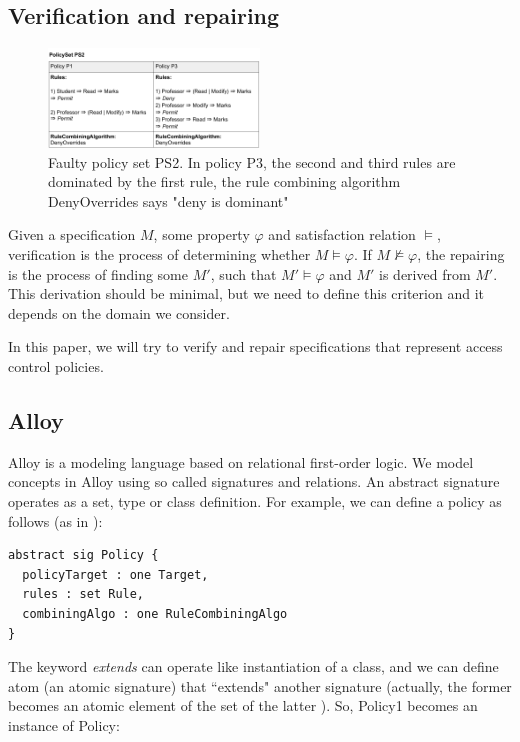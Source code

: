 \documentclass[letterpaper]{acm_proc_article-sp}
\begin{document}
\subsection{Verification and repairing}

\begin{figure}[h]
\includegraphics[width=0.5\textwidth]{policyset_faulty.png}
\caption{Faulty policy set PS2. In policy P3, the second and third rules are dominated by the first rule, the rule combining algorithm DenyOverrides says "deny is dominant"}    
  \label{fig:policysetfaulty}
\end{figure}

Given a specification $M$, some property $\varphi$ and satisfaction relation $\models$, verification is the process of determining whether $M\models\varphi$. If $M\not\models\varphi$, the repairing is the process of finding some $M'$, such that $M'\models\varphi$ and $M'$ is derived from $M'$. This derivation should be minimal, but we need to define this criterion and it depends on the domain we consider.

In this paper, we will try to verify and repair specifications that represent access control policies.

\subsection{Alloy}
Alloy \cite{jackson:alloy} is a modeling language based on relational first-order logic. We model concepts in Alloy using so called signatures and relations. An abstract signature operates as a set, type or class definition. For example, we can define a policy as follows (as in \cite{acp:alloy}):
 
 \begin{verbatim}
abstract sig Policy {
  policyTarget : one Target,
  rules : set Rule,
  combiningAlgo : one RuleCombiningAlgo
} 
\end{verbatim}

The keyword \textit{extends} can operate like instantiation of a class, and we can define atom (an atomic signature) that ``extends" another signature (actually, the former becomes an atomic element of the set of the latter \cite{jackson:alloy}). So, Policy1 becomes an instance of Policy:
\end{document}
